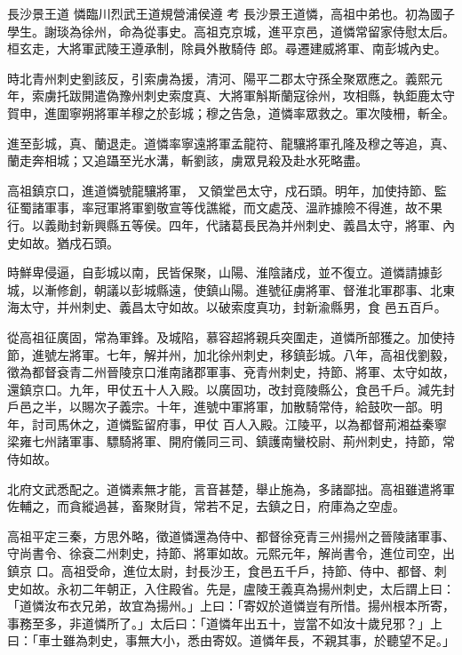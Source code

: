 
\begin{pinyinscope}

 長沙景王道
 憐臨川烈武王道規營浦侯遵
 考
 長沙景王道憐，高祖中弟也。初為國子學生。謝琰為徐州，命為從事史。高祖克京城，進平京邑，道憐常留家侍慰太后。桓玄走，大將軍武陵王遵承制，除員外散騎侍
 郎。尋遷建威將軍、南彭城內史。



 時北青州刺史劉該反，引索虜為援，清河、陽平二郡太守孫全聚眾應之。義熙元年，索虜托跋開遣偽豫州刺史索度真、大將軍斛斯蘭寇徐州，攻相縣，執鉅鹿太守賀申，進圍寧朔將軍羊穆之於彭城；穆之告急，道憐率眾救之。軍次陵柵，斬全。



 進至彭城，真、蘭退走。道憐率寧遠將軍孟龍符、龍驤將軍孔隆及穆之等追，真、蘭走奔相城；又追躡至光水溝，斬劉該，虜眾見殺及赴水死略盡。



 高祖鎮京口，進道憐號龍驤將軍，
 又領堂邑太守，戍石頭。明年，加使持節、監征蜀諸軍事，率冠軍將軍劉敬宣等伐譙縱，而文處茂、溫祚據險不得進，故不果行。以義勛封新興縣五等侯。四年，代諸葛長民為并州刺史、義昌太守，將軍、內史如故。猶戍石頭。



 時鮮卑侵逼，自彭城以南，民皆保聚，山陽、淮陰諸戍，並不復立。道憐請據彭城，以漸修創，朝議以彭城縣遠，使鎮山陽。進號征虜將軍、督淮北軍郡事、北東海太守，并州刺史、義昌太守如故。以破索度真功，封新渝縣男，食
 邑五百戶。



 從高祖征廣固，常為軍鋒。及城陷，慕容超將親兵突圍走，道憐所部獲之。加使持節，進號左將軍。七年，解并州，加北徐州刺史，移鎮彭城。八年，高祖伐劉毅，徵為都督袞青二州晉陵京口淮南諸郡軍事、兗青州刺史，持節、將軍、太守如故，還鎮京口。九年，甲仗五十人入殿。以廣固功，改封竟陵縣公，食邑千戶。減先封戶邑之半，以賜次子義宗。十年，進號中軍將軍，加散騎常侍，給鼓吹一部。明年，討司馬休之，道憐監留府事，甲仗
 百人入殿。江陵平，以為都督荊湘益秦寧梁雍七州諸軍事、驃騎將軍、開府儀同三司、鎮護南蠻校尉、荊州刺史，持節，常侍如故。



 北府文武悉配之。道憐素無才能，言音甚楚，舉止施為，多諸鄙拙。高祖雖遣將軍佐輔之，而貪縱過甚，畜聚財貨，常若不足，去鎮之日，府庫為之空虛。



 高祖平定三秦，方思外略，徵道憐還為侍中、都督徐兗青三州揚州之晉陵諸軍事、守尚書令、徐袞二州刺史，持節、將軍如故。元熙元年，解尚書令，進位司空，出鎮京
 口。高祖受命，進位太尉，封長沙王，食邑五千戶，持節、侍中、都督、刺史如故。永初二年朝正，入住殿省。先是，盧陵王義真為揚州刺史，太后謂上曰：「道憐汝布衣兄弟，故宜為揚州。」上曰：「寄奴於道憐豈有所惜。揚州根本所寄，事務至多，非道憐所了。」太后曰：「道憐年出五十，豈當不如汝十歲兒邪？」上曰：「車士雖為刺史，事無大小，悉由寄奴。道憐年長，不親其事，於聽望不足。」




\end{pinyinscope}
